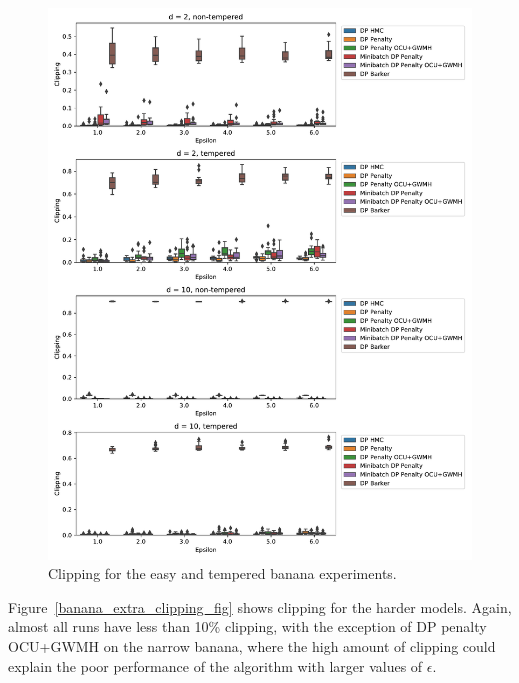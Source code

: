 \documentclass[english,twoside,openright]{HYgraduMLDS}
\begin{document}
\begin{figure}
  \centering
  \includegraphics[width=\textwidth]{figures/banana_clipping.pdf}
  \caption{
    Clipping for the easy and tempered banana experiments.
  }
  \label{banana_clipping_fig}
\end{figure}

Figure~\ref{banana_extra_clipping_fig} shows clipping for the harder models.
Again, almost all runs have less than 10\% clipping, with the exception of
DP penalty OCU+GWMH on the narrow banana, where the high amount of clipping
could explain the poor performance of the algorithm with larger values
of \(\epsilon\).
\end{document}
